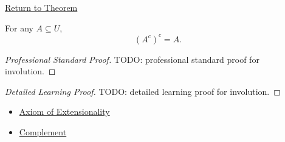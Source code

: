 \newpage
{}
\label{prf:involution}

\begin{remark*}[Return]
\hyperref[thm:involution]{Return to Theorem}
\end{remark*}

\begin{theorem*}
For any $A \subseteq U$,
\[
(A^c)^c = A.
\]
\end{theorem*}

\begin{proof}[Professional Standard Proof]
\LRAProofBodyStart
TODO: professional standard proof for involution.
\end{proof}

\begin{proof}[Detailed Learning Proof]
\LRAProofBodyStart
TODO: detailed learning proof for involution.
\end{proof}

\begin{remark*}
\end{remark*}

\begin{dependencies}
\begin{itemize}
  \item \hyperref[ax:extensionality]{Axiom of Extensionality}
  \item \hyperref[def:complement]{Complement}
\end{itemize}
\end{dependencies}

\clearpage

